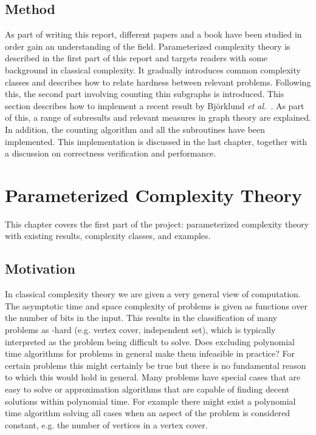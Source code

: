 \documentclass[a4paper,11pt]{report}
\theoremstyle{plain}
\theoremstyle{definition}
\begin{document}
\section{Method}
As part of writing this report, different papers and a book \cite{FG06} have been studied in order gain an understanding of the field.
Parameterized complexity theory is described in the first part of this report and targets readers with some background in classical complexity.
It gradually introduces common complexity classes and describes how to relate hardness between relevant problems.
Following this, the second part involving counting thin subgraphs is introduced.
This section describes how to implement a recent result by Bj\"orklund \emph{et al.}~\cite{BHKK13}.
As part of this, a range of subresults and relevant measures in graph theory are explained.
In addition, the counting algorithm and all the subroutines have been implemented.
This implementation is discussed in the last chapter, together with a discussion on correctness verification and performance.

\chapter{Parameterized Complexity Theory}
This chapter covers the first part of the project: parameterized complexity theory with existing results, complexity classes, and examples.

\section{Motivation}
In classical complexity theory we are given a very general view of computation.
The asymptotic time and space complexity of problems is given as functions over the number of bits in the input.
This results in the classification of many problems as \NP-hard (e.g. vertex cover, independent set), which is typically interpreted as the problem being difficult to solve.
Does excluding polynomial time algorithms for problems in general make them infeasible in practice?
For certain problems this might certainly be true but there is no fundamental reason to which this would hold in general.
Many problems have special cases that are easy to solve or approximation algorithms that are capable of finding decent solutions within polynomial time.
For example there might exist a polynomial time algorithm solving all cases when an aspect of the problem is considered constant, e.g. the number of vertices in a vertex cover.
\end{document}
